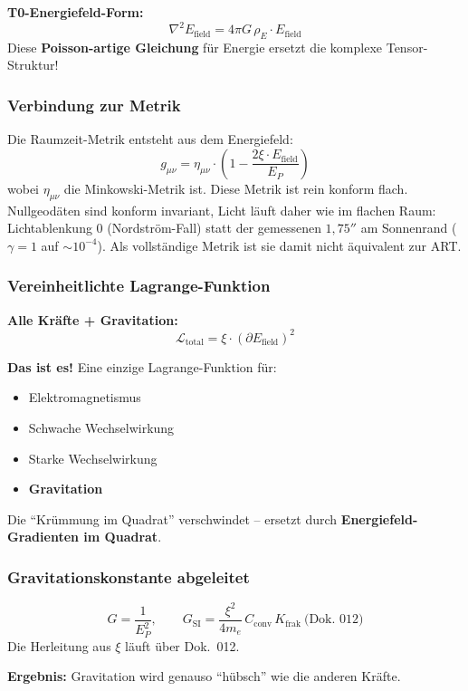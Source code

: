 	\textbf{T0-Energiefeld-Form:}
	\[
	\boxed{\nabla^2 E_{\text{field}} = 4\pi G \, \rho_E \cdot E_{\text{field}}}
	\]
	Diese \textbf{Poisson-artige Gleichung} für Energie ersetzt die komplexe Tensor-Struktur!
	
	\subsubsection*{Verbindung zur Metrik}
	
	Die Raumzeit-Metrik entsteht aus dem Energiefeld:
	\[
	g_{\mu\nu} = \eta_{\mu\nu} \cdot \left(1 - \frac{2\xi \cdot E_{\text{field}}}{E_P}\right)
	\]
	wobei $\eta_{\mu\nu}$ die Minkowski-Metrik ist. Diese Metrik ist rein konform flach. Nullgeodäten sind konform invariant, Licht läuft daher wie im flachen Raum: Lichtablenkung $0$ (Nordström-Fall) statt der gemessenen $1{,}75''$ am Sonnenrand ($\gamma = 1$ auf $\sim 10^{-4}$). Als vollständige Metrik ist sie damit nicht äquivalent zur ART.
	
	\subsubsection*{Vereinheitlichte Lagrange-Funktion}
	
	\textbf{Alle Kräfte + Gravitation:}
	\[
	\boxed{\mathcal{L}_{\text{total}} = \xi \cdot (\partial E_{\text{field}})^2}
	\]
	
	\textbf{Das ist es!} Eine einzige Lagrange-Funktion für:
	\begin{itemize}
		\item Elektromagnetismus
		\item Schwache Wechselwirkung
		\item Starke Wechselwirkung
		\item \textbf{Gravitation}
	\end{itemize}
	
	Die ``Krümmung im Quadrat'' verschwindet – ersetzt durch \textbf{Energiefeld-Gradienten im Quadrat}.
	
	\subsubsection*{Gravitationskonstante abgeleitet}
	\[
	G = \frac{1}{E_P^2}, \qquad G_{\text{SI}} = \frac{\xi^2}{4m_e}\,C_{\text{conv}}\,K_{\text{frak}} \ \text{(Dok.~012)}
	\]
	Die Herleitung aus $\xi$ läuft über Dok.~012.
	
	\textbf{Ergebnis:} Gravitation wird genauso ``hübsch'' wie die anderen Kräfte.
	
